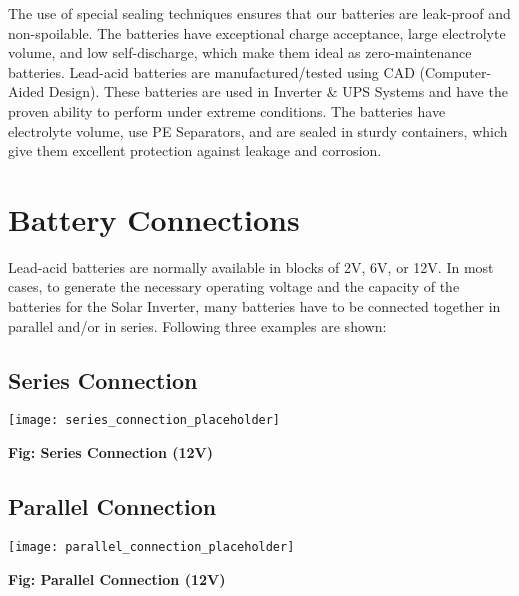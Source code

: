\documentclass[12pt]{article}
\begin{document}
The use of special sealing techniques ensures that our batteries are leak-proof and non-spoilable. The batteries have exceptional charge acceptance, large electrolyte volume, and low self-discharge, which make them ideal as zero-maintenance batteries. Lead-acid batteries are manufactured/tested using CAD (Computer-Aided Design). These batteries are used in Inverter \& UPS Systems and have the proven ability to perform under extreme conditions. The batteries have electrolyte volume, use PE Separators, and are sealed in sturdy containers, which give them excellent protection against leakage and corrosion.


\newpage


\section*{Battery Connections}

Lead-acid batteries are normally available in blocks of 2V, 6V, or 12V. In most cases, to generate the necessary operating voltage and the capacity of the batteries for the Solar Inverter, many batteries have to be connected together in parallel and/or in series. Following three examples are shown:

\subsection*{Series Connection}
\begin{center}
    \texttt{[image: series\_connection\_placeholder]} %
\end{center}
\begin{center}
    \textbf{Fig: Series Connection (12V)}
\end{center}

\subsection*{Parallel Connection}
\begin{center}
    \texttt{[image: parallel\_connection\_placeholder]} %
\end{center}
\begin{center}
    \textbf{Fig: Parallel Connection (12V)}
\end{center}
\end{document}
